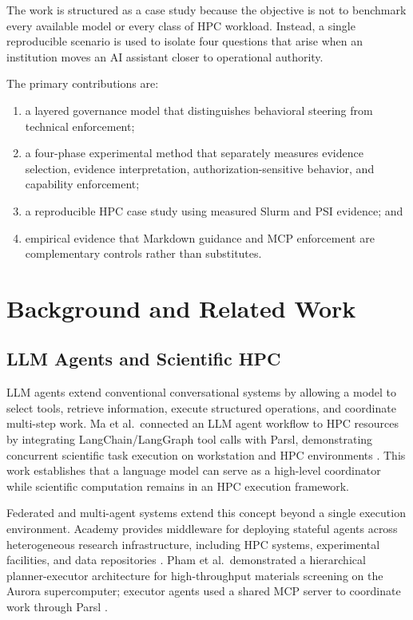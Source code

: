 \documentclass[11pt]{article}
\begin{document}
The work is structured as a case study because the objective is not to benchmark every available model or every class of HPC workload. Instead, a single reproducible scenario is used to isolate four questions that arise when an institution moves an AI assistant closer to operational authority.

The primary contributions are:
\begin{enumerate}
    \item a layered governance model that distinguishes behavioral steering from technical enforcement;
    \item a four-phase experimental method that separately measures evidence selection, evidence interpretation, authorization-sensitive behavior, and capability enforcement;
    \item a reproducible HPC case study using measured Slurm and PSI evidence; and
    \item empirical evidence that Markdown guidance and MCP enforcement are complementary controls rather than substitutes.
\end{enumerate}

\section{Background and Related Work}

\subsection{LLM Agents and Scientific HPC}

LLM agents extend conventional conversational systems by allowing a model to select tools, retrieve information, execute structured operations, and coordinate multi-step work. Ma et al.\ connected an LLM agent workflow to HPC resources by integrating LangChain/LangGraph tool calls with Parsl, demonstrating concurrent scientific task execution on workstation and HPC environments \cite{ma2025hpcagent}. This work establishes that a language model can serve as a high-level coordinator while scientific computation remains in an HPC execution framework.

Federated and multi-agent systems extend this concept beyond a single execution environment. Academy provides middleware for deploying stateful agents across heterogeneous research infrastructure, including HPC systems, experimental facilities, and data repositories \cite{kamatar2026academy}. Pham et al.\ demonstrated a hierarchical planner-executor architecture for high-throughput materials screening on the Aurora supercomputer; executor agents used a shared MCP server to coordinate work through Parsl \cite{pham2026multiagent}.
\end{document}
